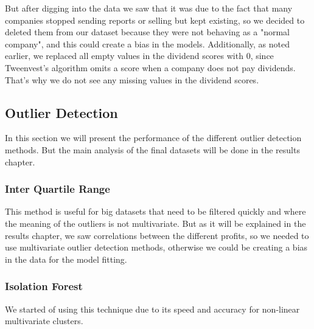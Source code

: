 \documentclass[11pt,english,a4paper,hidelinks]{book}
\begin{document}
\noindent   But after digging into the data we saw that it was due to the fact that many companies stopped sending reports or selling but kept existing, so we decided to deleted them from our dataset because they were not behaving as a "normal company", and this could create a bias in the models. Additionally, as noted earlier, we replaced all empty values in the dividend scores with 0, since Tweenvest's algorithm omits a score when a company does not pay dividends. That's why we do not see any missing values in the dividend scores.

\subsection{Outlier Detection}


In this section we will present the performance of the different outlier detection methods. But the main analysis of the final datasets will be done in the results chapter.

\subsubsection{Inter Quartile Range}

This method is useful for big datasets that need to be filtered quickly and where the meaning of the outliers is not multivariate. But as it will be explained in the results chapter, we saw correlations between the different profits, so we needed to use multivariate outlier detection methods, otherwise we could be creating a bias in the data for the model fitting.

\subsubsection{Isolation Forest}

We started of using this technique due to its speed and accuracy for non-linear multivariate clusters.
\end{document}
